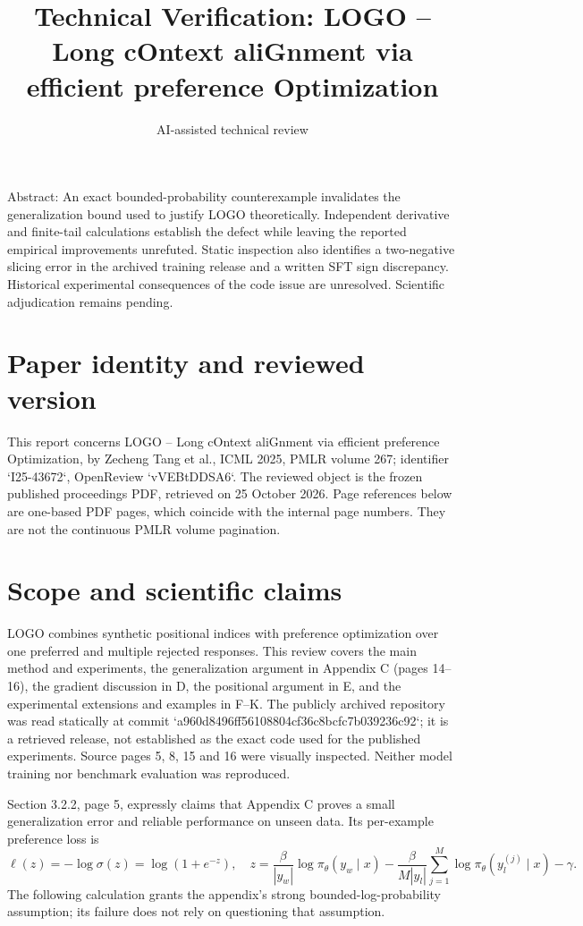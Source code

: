\documentclass[10pt]{article}
\title{Technical Verification: LOGO – Long cOntext aliGnment via efficient preference Optimization}
\author{AI-assisted technical review}
\date{}
\begin{document}
\maketitle
Abstract: An exact bounded-probability counterexample invalidates the generalization bound used to justify LOGO theoretically. Independent derivative and finite-tail calculations establish the defect while leaving the reported empirical improvements unrefuted. Static inspection also identifies a two-negative slicing error in the archived training release and a written SFT sign discrepancy. Historical experimental consequences of the code issue are unresolved. Scientific adjudication remains pending.\par
\section*{Paper identity and reviewed version}
This report concerns LOGO – Long cOntext aliGnment via efficient preference Optimization, by Zecheng Tang et al., ICML 2025, PMLR volume 267; identifier `I25-43672`, OpenReview `vVEBtDDSA6`. The reviewed object is the frozen published proceedings PDF, retrieved on 25 October 2026. Page references below are one-based PDF pages, which coincide with the internal page numbers. They are not the continuous PMLR volume pagination.\par
\section*{Scope and scientific claims}
LOGO combines synthetic positional indices with preference optimization over one preferred and multiple rejected responses. This review covers the main method and experiments, the generalization argument in Appendix C (pages 14–16), the gradient discussion in D, the positional argument in E, and the experimental extensions and examples in F–K. The publicly archived repository was read statically at commit `a960d8496ff56108804cf36c8bcfc7b039236c92`; it is a retrieved release, not established as the exact code used for the published experiments. Source pages 5, 8, 15 and 16 were visually inspected. Neither model training nor benchmark evaluation was reproduced.\par
Section 3.2.2, page 5, expressly claims that Appendix C proves a small generalization error and reliable performance on unseen data. Its per-example preference loss is \[\ell(z)=-\log\sigma(z)=\log(1+e^{-z}),\quad
z=\frac\beta{|y_w|}\log\pi_\theta(y_w\mid x)-\frac\beta{M|y_l|}\sum_{j=1}^M\log\pi_\theta(y_l^{(j)}\mid x)-\gamma.\] The following calculation grants the appendix’s strong bounded-log-probability assumption; its failure does not rely on questioning that assumption.\par
\end{document}

